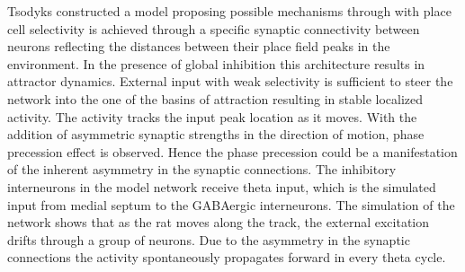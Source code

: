 Tsodyks \cite{Tsodyks1996} constructed a model proposing possible mechanisms through with place cell selectivity is achieved through a specific synaptic connectivity between neurons reflecting the distances between their place field peaks in the environment. In the presence of global inhibition this architecture results in attractor dynamics. External input with weak selectivity is sufficient to steer the network into the one of the basins of attraction resulting in stable localized activity. The activity tracks the input peak location as it moves. With the addition of asymmetric synaptic strengths in the direction of motion, phase precession effect is observed. Hence the phase precession could be a manifestation of the inherent asymmetry in the synaptic connections. The inhibitory interneurons in the model network receive theta input, which is the simulated input from medial septum to the GABAergic interneurons. The simulation of the network shows that as the rat moves along the track, the external excitation drifts through a group of neurons. Due to the asymmetry in the synaptic connections the activity spontaneously propagates forward in every theta cycle. \\  

